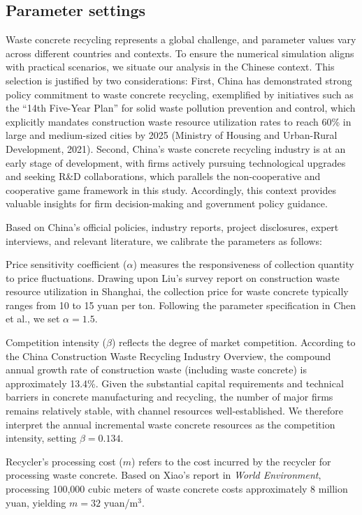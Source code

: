 \documentclass[authoryear,preprint,review,times,10pt]{elsarticle}
\begin{document}
\subsection{Parameter settings}
Waste concrete recycling represents a global challenge, and parameter values vary across different countries and contexts. To ensure the numerical simulation aligns with practical scenarios, we situate our analysis in the Chinese context. This selection is justified by two considerations: First, China has demonstrated strong policy commitment to waste concrete recycling, exemplified by initiatives such as the ``14th Five-Year Plan'' for solid waste pollution prevention and control, which explicitly mandates construction waste resource utilization rates to reach 60\% in large and medium-sized cities by 2025 (Ministry of Housing and Urban-Rural Development, 2021). Second, China's waste concrete recycling industry is at an early stage of development, with firms actively pursuing technological upgrades and seeking R\&D collaborations, which parallels the non-cooperative and cooperative game framework in this study. Accordingly, this context provides valuable insights for firm decision-making and government policy guidance.

Based on China's official policies, industry reports, project disclosures, expert interviews, and relevant literature, we calibrate the parameters as follows:

Price sensitivity coefficient ($\alpha$) measures the responsiveness of collection quantity to price fluctuations. Drawing upon Liu's survey report on construction waste resource utilization in Shanghai, the collection price for waste concrete typically ranges from 10 to 15 yuan per ton. Following the parameter specification in Chen et al., we set $\alpha = 1.5$.

Competition intensity ($\beta$) reflects the degree of market competition. According to the China Construction Waste Recycling Industry Overview, the compound annual growth rate of construction waste (including waste concrete) is approximately 13.4\%. Given the substantial capital requirements and technical barriers in concrete manufacturing and recycling, the number of major firms remains relatively stable, with channel resources well-established. We therefore interpret the annual incremental waste concrete resources as the competition intensity, setting $\beta = 0.134$.

Recycler's processing cost ($m$) refers to the cost incurred by the recycler for processing waste concrete. Based on Xiao's report in \textit{World Environment}, processing 100,000 cubic meters of waste concrete costs approximately 8 million yuan, yielding $m = 32$ yuan/m$^3$.
\end{document}
